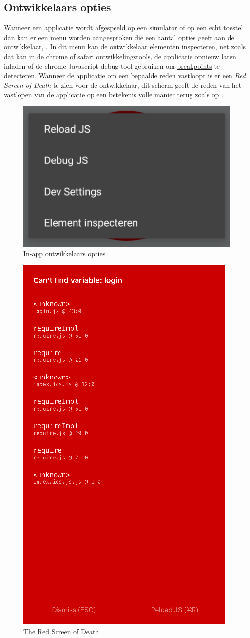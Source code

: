 \subsection{Ontwikkelaars opties}
Wanneer een applicatie wordt afgespeeld op een simulator of op een echt toestel dan kan er een menu worden aangesproken die een aantal opties geeft aan de ontwikkelaar, . In dit menu kan de ontwikkelaar elementen inspecteren, net zoals dat kan in de chrome of safari ontwikkelingstools, de applicatie opnieuw laten inladen of de chrome Javascript debug tool gebruiken om \hyperref[breakpoint]{breakpoints} te detecteren. Wanneer de applicatie om een bepaalde reden vastloopt is er een \emph{Red Screen of Death} te zien voor de ontwikkelaar, dit scherm geeft de reden van het vastlopen van de applicatie op een betekenis volle manier terug zoals op .   
	
	\begin{figure}%
	\centering
	\includegraphics[width=.5\columnwidth]{img/devtools.png}%
	\caption{In-app ontwikkelaars opties}%
	\label{fig:devtools}%
	\end{figure}
	
	\begin{figure}%
	\centering
	\includegraphics[width=0.5\columnwidth]{img/redscreen.png}%
	\caption{The Red Screen of Death}%
	\label{fig:redscreen}%
	\end{figure}
	
